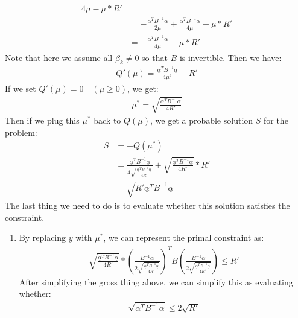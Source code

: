 \documentclass[11pt,letterpaper]{article}
\begin{document}
\begin{tcolorbox}
\begin{enumerate}[\quad \quad]
\begin{align*}
            {4\mu} - \mu * R' \\
            &= - \frac{\underline \alpha^T B^{-1} \underline \alpha}{2\mu} + 
            \frac{\underline \alpha^T B^{-1} \underline \alpha}
            {4\mu} - \mu * R' \\
            &= - \frac{\underline \alpha^T B^{-1} \underline \alpha}{4\mu} - \mu * R'
        \end{align*}
        Note that here we assume all $\beta_k \not = 0$ so that $B$ is invertible. Then we have:
        \begin{align*}
            Q'(\mu) = \frac{\underline \alpha^T B^{-1} \underline \alpha}{4\mu^2} - R'
        \end{align*}
        If we set $Q'(\mu) = 0 \quad (\mu \geq 0)$, we get:
        \begin{align*}
            \mu^\ast = \sqrt{\frac{\underline \alpha^T B^{-1} \underline \alpha}{4R'}} 
        \end{align*}
        Then if we plug this $\mu^\ast$ back to $Q(\mu)$, we get a probable solution $S$ for the problem:
        \begin{align*}
            S &= -Q(\mu^\ast) \\
            &=  \frac{\underline \alpha^T B^{-1} \underline \alpha}{4\sqrt{\frac{\underline \alpha^T B^{-1} \underline \alpha}{4R'}}} 
            + \sqrt{\frac{\underline \alpha^T B^{-1} \underline \alpha}{4R'}}   * R' \\
            &= \sqrt{R' \underline \alpha^T B^{-1} \underline \alpha}
        \end{align*}
        The last thing we need to do is to evaluate whether this solution satisfies the constraint.
    \end{enumerate}
\end{tcolorbox}

\newpage

\begin{tcolorbox}
    \begin{enumerate}[\quad \quad]
        \item By replacing $\underline y$ with $\mu^\ast$, we can represent the primal constraint as:
        \begin{align*}
            \sqrt{\frac{\underline \alpha^T B^{-1} \underline \alpha}{4R'}} * 
            (\frac{B^{-1} \alpha}{2\sqrt{\frac{\underline \alpha^T B^{-1} \underline \alpha}{4R'}}})^T
            B
            (\frac{B^{-1} \alpha}{2\sqrt{\frac{\underline \alpha^T B^{-1} \underline \alpha}{4R'}}})
            \leq R'
        \end{align*}
        After simplifying the gross thing above, we can simplify this as evaluating whether:
        \begin{align*}
            \sqrt{\alpha^T B^{-1} \alpha } \leq 
            2\sqrt{R'}
        \end{align*}
    \end{enumerate}
\end{tcolorbox}
\end{document}
